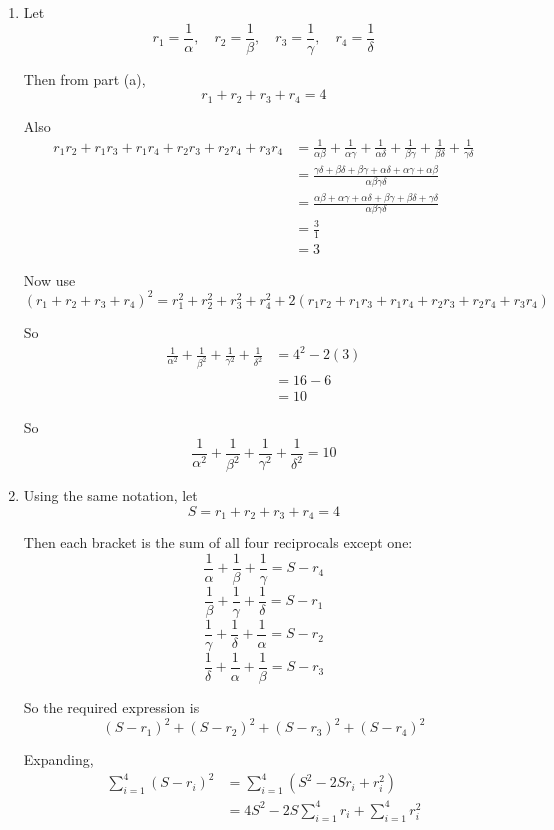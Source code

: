 \documentclass[leqno]{article}
\begin{document}
\begin{enumerate}[
  label=\textbf{\arabic*.},
  leftmargin=*,
  topsep=0pt,
  partopsep=0pt,
  parsep=0pt
]
\begin{tcolorbox}[colback=white, colframe=scarlet, title={\textbf{Solution}}, breakable, grow to left by=6mm, grow to right by=10mm]
\begin{enumerate}[label=\textbf{(\alph*)}]
  \item Let
  \[
  r_1=\frac{1}{\alpha},\quad r_2=\frac{1}{\beta},\quad r_3=\frac{1}{\gamma},\quad r_4=\frac{1}{\delta}
  \]

  Then from part (a),
  \[
  r_1+r_2+r_3+r_4=4
  \]

  Also
  \begin{align*}
  r_1r_2+r_1r_3+r_1r_4+r_2r_3+r_2r_4+r_3r_4
  &=\frac{1}{\alpha\beta}+\frac{1}{\alpha\gamma}+\frac{1}{\alpha\delta}+\frac{1}{\beta\gamma}+\frac{1}{\beta\delta}+\frac{1}{\gamma\delta}\\
  &=\frac{\gamma\delta+\beta\delta+\beta\gamma+\alpha\delta+\alpha\gamma+\alpha\beta}{\alpha\beta\gamma\delta}\\
  &=\frac{\alpha\beta+\alpha\gamma+\alpha\delta+\beta\gamma+\beta\delta+\gamma\delta}{\alpha\beta\gamma\delta}\\
  &=\frac{3}{1}\\
  &=3
  \end{align*}

  Now use
  \[
  (r_1+r_2+r_3+r_4)^2=r_1^2+r_2^2+r_3^2+r_4^2+2(r_1r_2+r_1r_3+r_1r_4+r_2r_3+r_2r_4+r_3r_4)
  \]

  So
  \begin{align*}
  \frac{1}{\alpha^2}+\frac{1}{\beta^2}+\frac{1}{\gamma^2}+\frac{1}{\delta^2}
  &=4^2-2(3)\\
  &=16-6\\
  &=10
  \end{align*}

  So
  \[
  \frac{1}{\alpha^2}+\frac{1}{\beta^2}+\frac{1}{\gamma^2}+\frac{1}{\delta^2}=10
  \]

  \item Using the same notation, let
  \[
  S=r_1+r_2+r_3+r_4=4
  \]

  Then each bracket is the sum of all four reciprocals except one:
  \[
  \frac{1}{\alpha}+\frac{1}{\beta}+\frac{1}{\gamma}=S-r_4
  \]
  \[
  \frac{1}{\beta}+\frac{1}{\gamma}+\frac{1}{\delta}=S-r_1
  \]
  \[
  \frac{1}{\gamma}+\frac{1}{\delta}+\frac{1}{\alpha}=S-r_2
  \]
  \[
  \frac{1}{\delta}+\frac{1}{\alpha}+\frac{1}{\beta}=S-r_3
  \]

  So the required expression is
  \[
  (S-r_1)^2+(S-r_2)^2+(S-r_3)^2+(S-r_4)^2
  \]

  Expanding,
  \begin{align*}
  \sum_{i=1}^4 (S-r_i)^2
  &=\sum_{i=1}^4 \left(S^2-2Sr_i+r_i^2\right)\\
  &=4S^2-2S\sum_{i=1}^4 r_i+\sum_{i=1}^4 r_i^2
  \end{align*}


\end{enumerate}
\end{tcolorbox}
\end{enumerate}
\end{document}
